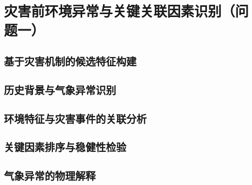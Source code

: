 \section{灾害前环境异常与关键关联因素识别（问题一）}\label{sec:factors}

\subsection{基于灾害机制的候选特征构建}\label{sec:candidate-features}
\writingplaceholder

\subsection{历史背景与气象异常识别}\label{sec:anomaly-detection}
\writingplaceholder

\subsection{环境特征与灾害事件的关联分析}\label{sec:association}
\writingplaceholder

\subsection{关键因素排序与稳健性检验}\label{sec:factor-ranking}
\writingplaceholder

\subsection{气象异常的物理解释}\label{sec:physical-interpretation}
\writingplaceholder
